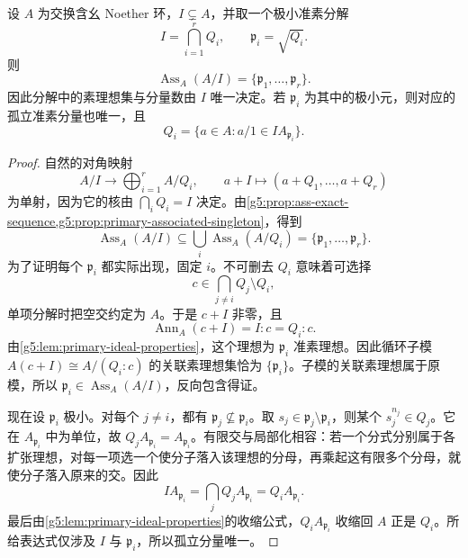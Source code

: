 \begin{theorem}\label{g5:thm:primary-uniqueness}
	设 \(A\) 为交换含幺 Noether 环，\(I\subsetneq A\)，并取一个极小准素分解
	\[
		I=\bigcap_{i=1}^rQ_i,\qquad \mathfrak p_i=\sqrt{Q_i}.
	\]
	则
	\[
		\operatorname{Ass}_A(A/I)=\{\mathfrak p_1,\ldots,\mathfrak p_r\}.
	\]
	因此分解中的素理想集与分量数由 \(I\) 唯一决定。若 \(\mathfrak p_i\) 为其中的极小元，则对应的孤立准素分量也唯一，且
	\[
		Q_i=\{a\in A:a/1\in IA_{\mathfrak p_i}\}.
	\]
\end{theorem}
\begin{proof}
	自然的对角映射
	\[
		A/I\longrightarrow\bigoplus_{i=1}^r A/Q_i,\qquad
		a+I\longmapsto(a+Q_1,\ldots,a+Q_r)
	\]
	为单射，因为它的核由 \(\bigcap_iQ_i=I\) 决定。由\cref{g5:prop:ass-exact-sequence,g5:prop:primary-associated-singleton}，得到
	\[
		\operatorname{Ass}_A(A/I)\subseteq\bigcup_i\operatorname{Ass}_A(A/Q_i)
		=\{\mathfrak p_1,\ldots,\mathfrak p_r\}.
	\]
	为了证明每个 \(\mathfrak p_i\) 都实际出现，固定 \(i\)。不可删去 \(Q_i\) 意味着可选择
	\[
		c\in\bigcap_{j\ne i}Q_j\setminus Q_i,
	\]
	单项分解时把空交约定为 \(A\)。于是 \(c+I\) 非零，且
	\[
		\operatorname{Ann}_A(c+I)=I:c=Q_i:c.
	\]
	由\cref{g5:lem:primary-ideal-properties}，这个理想为 \(\mathfrak p_i\) 准素理想。因此循环子模 \(A(c+I)\cong A/(Q_i:c)\) 的关联素理想集恰为 \(\{\mathfrak p_i\}\)。子模的关联素理想属于原模，所以 \(\mathfrak p_i\in\operatorname{Ass}_A(A/I)\)，反向包含得证。

	现在设 \(\mathfrak p_i\) 极小。对每个 \(j\ne i\)，都有 \(\mathfrak p_j\nsubseteq\mathfrak p_i\)。取 \(s_j\in\mathfrak p_j\setminus\mathfrak p_i\)，则某个 \(s_j^{n_j}\in Q_j\)。它在 \(A_{\mathfrak p_i}\) 中为单位，故 \(Q_jA_{\mathfrak p_i}=A_{\mathfrak p_i}\)。有限交与局部化相容：若一个分式分别属于各扩张理想，对每一项选一个使分子落入该理想的分母，再乘起这有限多个分母，就使分子落入原来的交。因此
	\[
		IA_{\mathfrak p_i}
		=\bigcap_j Q_jA_{\mathfrak p_i}
		=Q_iA_{\mathfrak p_i}.
	\]
	最后由\cref{g5:lem:primary-ideal-properties}的收缩公式，\(Q_iA_{\mathfrak p_i}\) 收缩回 \(A\) 正是 \(Q_i\)。所给表达式仅涉及 \(I\) 与 \(\mathfrak p_i\)，所以孤立分量唯一。
\end{proof}

